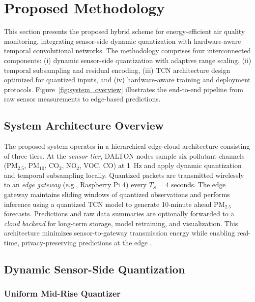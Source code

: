 \section{Proposed Methodology}
\label{sec:methodology}

This section presents the proposed hybrid scheme for energy-efficient air quality monitoring, integrating sensor-side dynamic quantization with hardware-aware temporal convolutional networks. The methodology comprises four interconnected components: (i) dynamic sensor-side quantization with adaptive range scaling, (ii) temporal subsampling and residual encoding, (iii) TCN architecture design optimized for quantized inputs, and (iv) hardware-aware training and deployment protocols. Figure~\ref{fig:system_overview} illustrates the end-to-end pipeline from raw sensor measurements to edge-based predictions.

\subsection{System Architecture Overview}

The proposed system operates in a hierarchical edge-cloud architecture consisting of three tiers. At the \textit{sensor tier}, DALTON nodes sample six pollutant channels (PM$_{2.5}$, PM$_{10}$, CO$_2$, NO$_2$, VOC, CO) at 1~Hz and apply dynamic quantization and temporal subsampling locally. Quantized packets are transmitted wirelessly to an \textit{edge gateway} (e.g., Raspberry Pi 4) every $T_S = 4$ seconds. The edge gateway maintains sliding windows of quantized observations and performs inference using a quantized TCN model to generate 10-minute ahead PM$_{2.5}$ forecasts. Predictions and raw data summaries are optionally forwarded to a \textit{cloud backend} for long-term storage, model retraining, and visualization. This architecture minimizes sensor-to-gateway transmission energy while enabling real-time, privacy-preserving predictions at the edge \cite{himeur2024edge, fici2025sensors}.

\subsection{Dynamic Sensor-Side Quantization}

\subsubsection{Uniform Mid-Rise Quantizer}

